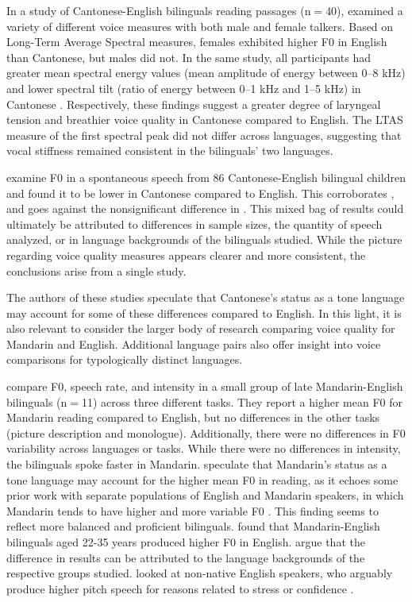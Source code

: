 In a study of Cantonese-English bilinguals reading passages (n$=$40), \citet{ng_2012_ltas} examined a variety of different voice measures with both male and female talkers. Based on Long-Term Average Spectral measures, females exhibited higher F0 in English than Cantonese, but males did not. In the same study, all participants had greater mean spectral energy values (mean amplitude of energy between 0--8 kHz) and lower spectral tilt (ratio of energy between 0--1 kHz and 1--5 kHz) in Cantonese \citep{ng_2012_ltas}. Respectively, these findings suggest a greater degree of laryngeal tension and breathier voice quality in Cantonese compared to English. The LTAS measure of the first spectral peak did not differ across languages, suggesting that vocal stiffness remained consistent in the bilinguals' two languages. 

\citet{ng_2010_voice} examine F0 in a spontaneous speech from 86 Cantonese-English bilingual children and found it to be lower in Cantonese compared to English. This corroborates \citet{ng_2012_ltas}, and goes against the nonsignificant difference in \citep{altenberg_2006_f0}. This mixed bag of results could ultimately be attributed to differences in sample sizes, the quantity of speech analyzed, or in language backgrounds of the bilinguals studied. While the picture regarding voice quality measures appears clearer and more consistent, the conclusions arise from a single study. 

The authors of these studies speculate that Cantonese's status as a tone language may account for some of these differences compared to English. In this light, it is also relevant to consider the larger body of research comparing voice quality for Mandarin and English. Additional language pairs also offer insight into voice comparisons for typologically distinct languages. %

\citet{lee_2017_bilingual} compare F0, speech rate, and intensity in a small group of late Mandarin-English bilinguals (n$=$11) across three different tasks. They report a higher mean F0 for Mandarin reading compared to English, but no differences in the other tasks (picture description and monologue). Additionally, there were no differences in F0 variability across languages or tasks. While there were no differences in intensity, the bilinguals spoke faster in Mandarin. \citet{lee_2017_bilingual} speculate that Mandarin's status as a tone language may account for the higher mean F0 in reading, as it echoes some prior work with separate populations of English and Mandarin speakers, in which Mandarin tends to have higher and more variable F0 \citep{keating_2012_f0}. This finding seems to reflect more balanced and proficient bilinguals. \citet{xue_2002_f0} found that Mandarin-English bilinguals aged 22-35 years produced higher F0 in English. \citet{lee_2017_bilingual} argue that the difference in results can be attributed to the language backgrounds of the respective groups studied. \citet{xue_2002_f0} looked at non-native English speakers, who arguably produce higher pitch speech for reasons related to stress or confidence \citep{jarvinen_2013_speaking, lee_2017_bilingual}.

